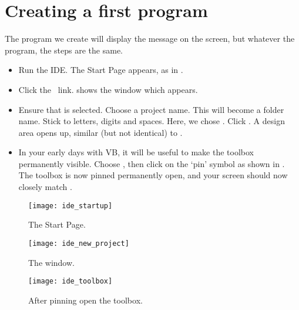	\section{Creating a first program}
		The program we create will display the message  on the screen, but whatever the program, the steps are the same.
		\begin{itemize}
			\item	Run the IDE. The Start Page appears, as in .
			\item	Click the \ link.  shows the  window which appears.
			\item	Ensure that  is selected. Choose a project name. This will become a folder name. Stick to letters, digits and spaces. Here, we chose . Click . A design area opens up, similar (but not identical) to .
			\item	In your early days with VB, it will be useful to make the toolbox permanently visible. Choose , then click on the ‘pin’ symbol as shown in . The toolbox is now pinned permanently open, and your screen should now closely match .
		\end{itemize}

		\begin{figure}[ht]
			\centering
			\texttt{[image: ide\_startup]}
			\caption{The Start Page.}
			\label{fig:ide_startup}
			\end{figure}

		\begin{figure}[ht]
			\centering
			\texttt{[image: ide\_new\_project]}
			\caption{The  window.}
			\label{fig:ide_new_project}
		\end{figure}

		\begin{figure}[ht]
			\centering
			\texttt{[image: ide\_toolbox]}
			\caption{After pinning open the toolbox.}
			\label{fig:ide_toolbox}
		\end{figure}



